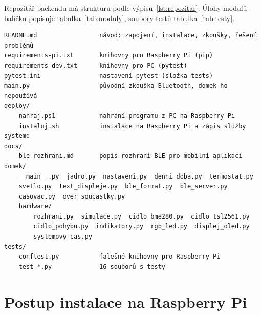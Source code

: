 Repozitář backendu má strukturu podle výpisu~\ref{lst:repozitar}. Úlohy modulů balíčku
 popisuje tabulka~\ref{tab:moduly}, soubory testů tabulka~\ref{tab:testy}.

\begin{lstlisting}[language={}, identifierstyle={}, caption={Struktura repozitáře backendu}, label=lst:repozitar]
README.md                 návod: zapojení, instalace, zkoušky, řešení problémů
requirements-pi.txt       knihovny pro Raspberry Pi (pip)
requirements-dev.txt      knihovny pro PC (pytest)
pytest.ini                nastavení pytest (složka tests)
main.py                   původní zkouška Bluetooth, domek ho nepoužívá
deploy/
    nahraj.ps1            nahrání programu z PC na Raspberry Pi
    instaluj.sh           instalace na Raspberry Pi a zápis služby systemd
docs/
    ble-rozhrani.md       popis rozhraní BLE pro mobilní aplikaci
domek/
    __main__.py  jadro.py  nastaveni.py  denni_doba.py  termostat.py
    svetlo.py  text_displeje.py  ble_format.py  ble_server.py
    casovac.py  over_soucastky.py
    hardware/
        rozhrani.py  simulace.py  cidlo_bme280.py  cidlo_tsl2561.py
        cidlo_pohybu.py  indikatory.py  rgb_led.py  displej_oled.py
        systemovy_cas.py
tests/
    conftest.py           falešné knihovny pro Raspberry Pi
    test_*.py             16 souborů s testy
\end{lstlisting}

\chapter{Postup instalace na Raspberry Pi}
\label{chap:priloha-instalace}

